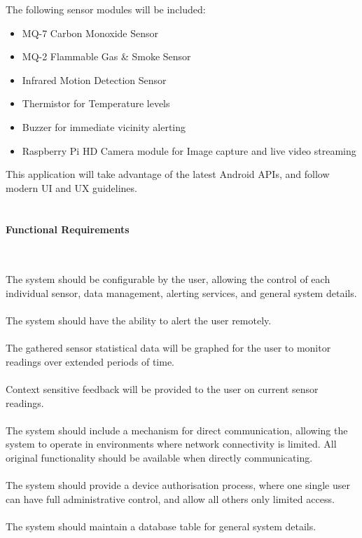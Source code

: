 \documentclass{article}
\begin{document}
The following sensor modules will be included:

\begin{itemize}
  \item MQ-7 Carbon Monoxide Sensor
  \item MQ-2 Flammable Gas \& Smoke Sensor
  \item Infrared Motion Detection Sensor	
  \item Thermistor for Temperature levels
  \item Buzzer for immediate vicinity alerting
  \item Raspberry Pi HD Camera module for Image capture and live video streaming 
\end{itemize}

This application will take advantage of the latest Android APIs, and follow modern UI and UX guidelines. \\\

\paragraph*{Functional Requirements}\

The system should be configurable by the user, allowing the control of each individual sensor, data management, alerting services, and general system details. \\\\ The system should have the ability to alert the user remotely.  \\\\ The gathered sensor statistical data will be graphed for the user to monitor readings over extended periods of time. \\\\ Context sensitive feedback will be provided to the user on current sensor readings. \\\\ The system should include a mechanism for direct communication, allowing the system to operate in environments where network connectivity is limited. All original functionality should be available when directly communicating. \\\\ The system should provide a device authorisation process, where one single user can have full administrative control, and allow all others only limited access.  \\\\ The system should maintain a database table for general system details.
\end{document}
